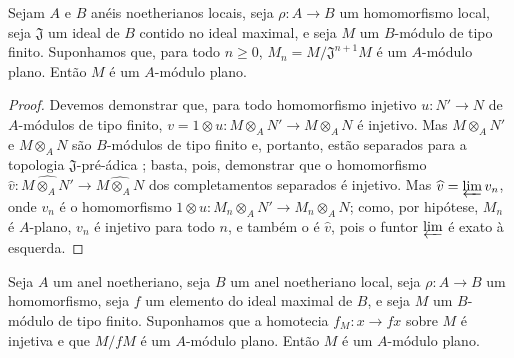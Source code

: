 \begin{proposition}[10.2.6]
\label{0.10.2.6}
Sejam $A$ e $B$ anéis noetherianos locais, seja $\rho:A\to B$ um homomorfismo local, seja $\mathfrak{J}$ um ideal de $B$ contido no ideal maximal, e seja $M$ um $B$-módulo de tipo finito.
Suponhamos que, para todo $n\geq0$, $M_n=M/\mathfrak{J}^{n+1}M$ é um $A$-módulo plano.
Então $M$ é um $A$-módulo plano.
\end{proposition}

\begin{proof}
Devemos demonstrar que, para todo homomorfismo injetivo $u:N'\to N$ de $A$-módulos de tipo finito, $v=1\otimes u:M\otimes_A N'\to M\otimes_A N$ é injetivo.
Mas $M\otimes_A N'$ e $M\otimes_A N$ são $B$-módulos de tipo finito e, portanto, estão separados para a topologia $\mathfrak{J}$-pré-ádica ;
basta, pois, demonstrar que o homomorfismo $\widehat{v}:\widehat{M\otimes_A N'}\to\widehat{M\otimes_A N}$ dos completamentos separados é injetivo.
Mas $\widehat{v}=\varprojlim v_n$, onde $v_n$ é o homomorfismo $1\otimes u:M_n\otimes_A N'\to M_n\otimes_A N$;
como, por hipótese, $M_n$ é $A$-plano, $v_n$ é injetivo para todo $n$, e também o é $\widehat{v}$, pois o funtor $\varprojlim$ é exato à esquerda.
\end{proof}

\begin{corollary}[10.2.7]
\label{0.10.2.7}
Seja $A$ um anel noetheriano, seja $B$ um anel noetheriano local, seja $\rho:A\to B$ um homomorfismo, seja $f$ um elemento do ideal maximal de $B$, e seja $M$ um $B$-módulo de tipo finito.
Suponhamos que a homotecia $f_M:x\to fx$ sobre $M$ é injetiva e que $M/fM$ é um $A$-módulo plano.
Então $M$ é um $A$-módulo plano.
\end{corollary}

